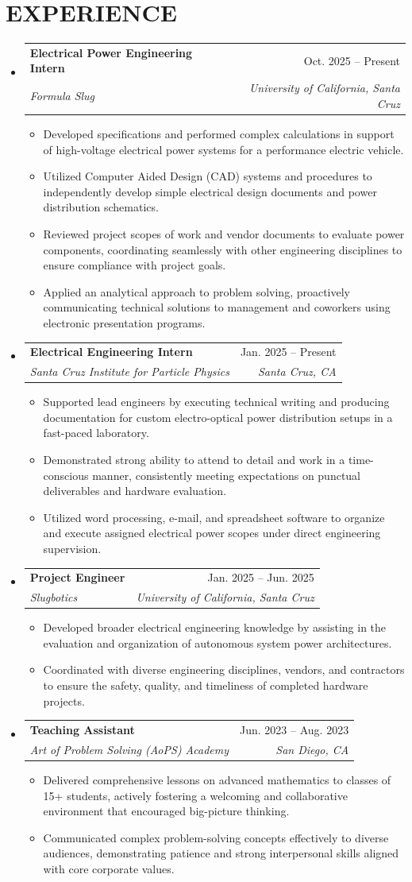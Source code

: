 \documentclass[letterpaper,11pt]{article}
\makeatletter
\newcommand{\resumeItem}[1]{
  \item\small{
    {#1 \vspace{-2pt}}
  }
}
\newcommand{\resumeSubheading}[4]{
  \vspace{-2pt}\item
    \begin{tabular*}{0.97\textwidth}[t]{l@{\extracolsep{\fill}}r}
      \textbf{#1} & #2 \\
      \textit{\small#3} & \textit{\small #4} \\
    \end{tabular*}\vspace{-7pt}
}
\newcommand{\resumeSubHeadingListStart}{\begin{itemize}[leftmargin=0.15in, label={}]}
\newcommand{\resumeSubHeadingListEnd}{\end{itemize}}
\newcommand{\resumeItemListStart}{\begin{itemize}}
\newcommand{\resumeItemListEnd}{\end{itemize}\vspace{-5pt}}
\makeatother
\begin{document}
\section{EXPERIENCE}
  \resumeSubHeadingListStart
    \resumeSubheading
      {Electrical Power Engineering Intern}{Oct. 2025 -- Present}
      {Formula Slug}{University of California, Santa Cruz}
      \resumeItemListStart
        \resumeItem{Developed specifications and performed complex calculations in support of high-voltage electrical power systems for a performance electric vehicle.}
        \resumeItem{Utilized Computer Aided Design (CAD) systems and procedures to independently develop simple electrical design documents and power distribution schematics.}
        \resumeItem{Reviewed project scopes of work and vendor documents to evaluate power components, coordinating seamlessly with other engineering disciplines to ensure compliance with project goals.}
        \resumeItem{Applied an analytical approach to problem solving, proactively communicating technical solutions to management and coworkers using electronic presentation programs.}
      \resumeItemListEnd
    \resumeSubheading
      {Electrical Engineering Intern}{Jan. 2025 -- Present}
      {Santa Cruz Institute for Particle Physics}{Santa Cruz, CA}
      \resumeItemListStart
        \resumeItem{Supported lead engineers by executing technical writing and producing documentation for custom electro-optical power distribution setups in a fast-paced laboratory.}
        \resumeItem{Demonstrated strong ability to attend to detail and work in a time-conscious manner, consistently meeting expectations on punctual deliverables and hardware evaluation.}
        \resumeItem{Utilized word processing, e-mail, and spreadsheet software to organize and execute assigned electrical power scopes under direct engineering supervision.}
      \resumeItemListEnd
    \resumeSubheading
      {Project Engineer}{Jan. 2025 -- Jun. 2025}
      {Slugbotics}{University of California, Santa Cruz}
      \resumeItemListStart
        \resumeItem{Developed broader electrical engineering knowledge by assisting in the evaluation and organization of autonomous system power architectures.}
        \resumeItem{Coordinated with diverse engineering disciplines, vendors, and contractors to ensure the safety, quality, and timeliness of completed hardware projects.}
      \resumeItemListEnd
    \resumeSubheading
      {Teaching Assistant}{Jun. 2023 -- Aug. 2023}
      {Art of Problem Solving (AoPS) Academy}{San Diego, CA}
      \resumeItemListStart
        \resumeItem{Delivered comprehensive lessons on advanced mathematics to classes of 15+ students, actively fostering a welcoming and collaborative environment that encouraged big-picture thinking.}
        \resumeItem{Communicated complex problem-solving concepts effectively to diverse audiences, demonstrating patience and strong interpersonal skills aligned with core corporate values.}
      \resumeItemListEnd
  \resumeSubHeadingListEnd
\end{document}
